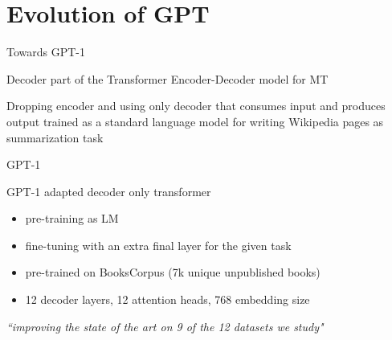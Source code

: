 \documentclass[12pt,aspectratio=169,handout]{beamer}
\begin{document}
\section{Evolution of GPT}
	

\begin{frame}{Towards GPT-1}
	
Decoder part of the Transformer Encoder-Decoder model for MT \citep{Vaswani.et.al.2017}

Dropping encoder and using only decoder that consumes input and produces output trained as a standard language model for writing Wikipedia pages as summarization task \citep{Liu.et.al.2018.ICLR}


	


\end{frame}


\begin{frame}{GPT-1}

GPT-1 \citep{Radford.et.al.2018.GPT1.report} adapted decoder only transformer

\begin{itemize}
\item pre-training as LM
\item fine-tuning with an extra final layer for the given task
\item pre-trained on BooksCorpus (7k unique unpublished books)
\item 12 decoder layers, 12 attention heads, 768 embedding size
\end{itemize}


\emph{``improving the state of the art on 9 of the 12 datasets we study"}	
	
	
	
	
\end{frame}
\end{document}
